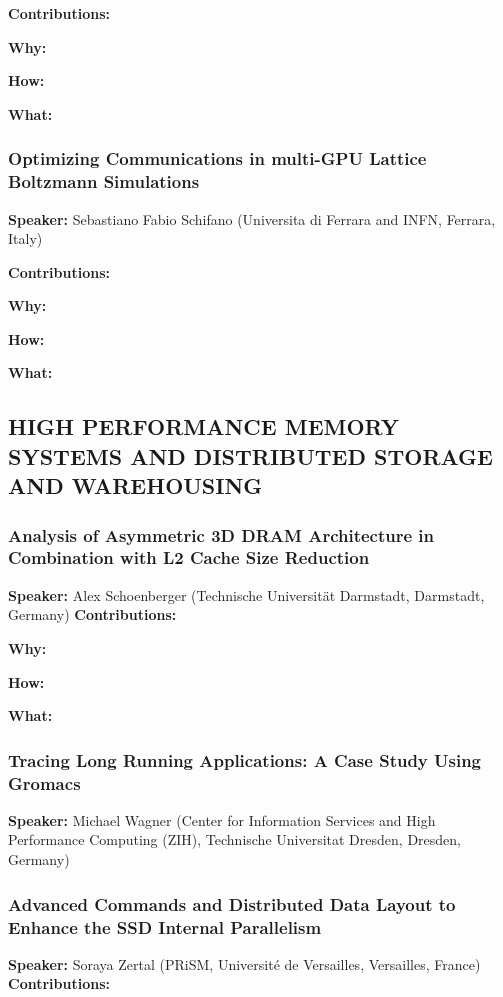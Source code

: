 \documentclass[twocolumn]{article}
\begin{document}
\noindent
\textbf{Contributions:}  

\noindent
\textbf{Why:}  

\noindent
\textbf{How:}  

\noindent
\textbf{What:}  

\subsubsection{Optimizing Communications in multi-GPU Lattice Boltzmann Simulations}
\textbf{Speaker:} Sebastiano Fabio Schifano (Universita di Ferrara and INFN, Ferrara, Italy)

\noindent
\textbf{Contributions:}  

\noindent
\textbf{Why:}  

\noindent
\textbf{How:}  

\noindent
\textbf{What:}  

\subsection{HIGH PERFORMANCE MEMORY SYSTEMS AND DISTRIBUTED STORAGE AND WAREHOUSING}
\subsubsection{Analysis of Asymmetric 3D DRAM Architecture in Combination with L2 Cache Size Reduction}
\textbf{Speaker:} Alex Schoenberger (Technische Universität Darmstadt, Darmstadt, Germany)
\noindent
\textbf{Contributions:}  

\noindent
\textbf{Why:}  

\noindent
\textbf{How:}  

\noindent
\textbf{What:}  

\subsubsection{Tracing Long Running Applications: A Case Study Using Gromacs}
\textbf{Speaker:} Michael Wagner (Center for Information Services and High Performance Computing (ZIH), Technische Universitat Dresden, Dresden, Germany)
\subsubsection{Advanced Commands and Distributed Data Layout to Enhance the SSD Internal Parallelism}
\textbf{Speaker:} Soraya Zertal (PRiSM, Université de Versailles, Versailles, France)
\noindent
\textbf{Contributions:}  
\end{document}
